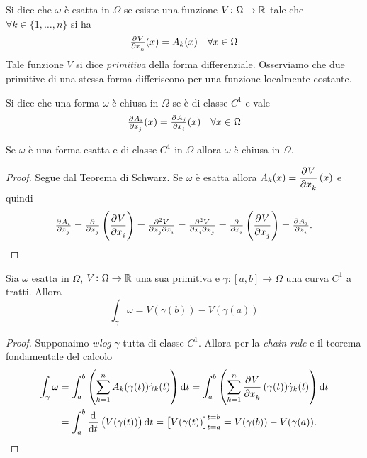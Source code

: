 \begin{definition}
	Si dice che $ \omega $ è esatta in $ \Omega $ se esiste una funzione $ V \colon \Omega \to \mathbb{R} $ tale che $ \forall k \in \{1, \ldots, n\} $ si ha
	\begin{equation}
		\pd{V}{x_k}(x) = A_k(x) \quad \forall x \in \Omega
	\end{equation}
	Tale funzione $ V $ si dice \emph{primitiva} della forma differenziale. Osserviamo che due primitive di una stessa forma differiscono per una funzione localmente costante.
\end{definition}

\begin{definition}
	Si dice che una forma $ \omega $ è chiusa in $ \Omega $ se è di classe $ C^1 $ e vale
	\begin{equation}
		\pd{A_i}{x_j}(x) = \pd{A_j}{x_i}(x) \quad \forall x \in \Omega
	\end{equation}
\end{definition}

\begin{thm}
	Se $ \omega $ è una forma esatta e di classe $ C^1 $ in $ \Omega $ allora $ \omega $ è chiusa in $ \Omega $.
\end{thm}
%
\begin{proof}
	Segue dal Teorema di Schwarz. Se $ \omega $ è esatta allora $ A_k(x) = \dpd{V}{x_k}(x) $ e quindi
	\[
		\pd{A_i}{x_j} = \pd{}{x_j} \left(\dpd{V}{x_i}\right) = \md{V}{2}{x_j}{}{x_i}{} = \md{V}{2}{x_i}{}{x_j}{} = \pd{}{x_i} \left(\dpd{V}{x_j}\right) = \pd{A_j}{x_i}. \qedhere
	\]
\end{proof}

\begin{prop} \label{prop:intformaesatta}
	Sia $ \omega $ esatta in $ \Omega $, $ V \colon \Omega \to \mathbb{R} $ una sua primitiva e $ \gamma \colon [a, b] \to \Omega $ una curva $ C^1 $ a tratti. Allora
	\begin{equation}
		\int_{\gamma} \omega = V(\gamma(b)) - V(\gamma(a))
	\end{equation}
\end{prop}
%
\begin{proof}
	Supponaimo \emph{wlog} $ \gamma $ tutta di classe $ C^1 $. Allora per la \emph{chain rule} e il teorema fondamentale del calcolo
	\begin{align*}
		\int_{\gamma} \omega & = \int_{a}^{b} \left(\sum_{k = 1}^{n} A_k(\gamma(t)) \dot{\gamma}_k(t)\right) \dif{t} = \int_{a}^{b} \left(\sum_{k = 1}^{n} \dpd{V}{x_k}(\gamma(t)) \dot{\gamma}_k(t)\right) \dif{t} \\
		& = \int_{a}^{b} \dod{}{t}\left(V(\gamma(t))\right) \dif{t} = \left[V(\gamma(t))\right]_{t = a}^{t = b} = V(\gamma(b)) - V(\gamma(a)). \qedhere
	\end{align*}
\end{proof}

